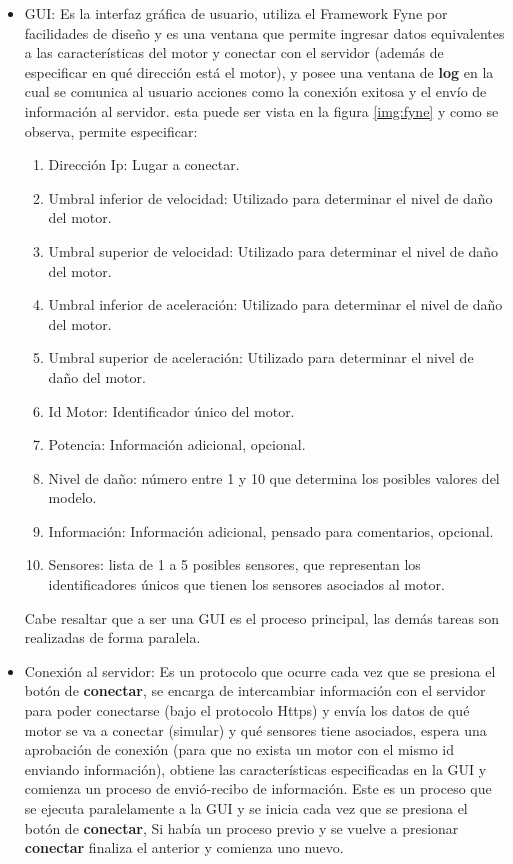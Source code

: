 \begin{itemize}
    \item GUI: Es la interfaz gráfica de usuario, utiliza el Framework Fyne por
        facilidades
        de diseño y es una ventana que permite ingresar datos equivalentes
        a las características del motor y conectar con el servidor (además de
        especificar en qué dirección está el motor), y posee una ventana de
        \textbf{log}  en la cual se comunica al usuario acciones como la conexión exitosa y
        el envío de información al servidor. esta puede ser vista
        en la figura \ref{img:fyne} y como se observa, permite especificar:
        \begin{enumerate}
            \item Dirección Ip: Lugar a conectar.
            \item Umbral inferior de velocidad: Utilizado para determinar el nivel de daño del motor.
            \item Umbral superior de velocidad: Utilizado para determinar el nivel de daño del motor.
            \item Umbral inferior de aceleración: Utilizado para determinar el nivel de daño del motor.
            \item Umbral superior de aceleración: Utilizado para determinar el nivel de daño del motor.
            \item Id Motor: Identificador único del motor.
            \item Potencia: Información adicional, opcional.
            \item Nivel de daño: número entre 1 y 10 que determina los posibles
                valores del modelo.
            \item Información: Información adicional, pensado para comentarios,
                opcional.
            \item Sensores: lista de 1 a 5 posibles sensores, que representan
                los identificadores únicos que tienen los sensores asociados
                al motor.
        \end{enumerate}

        Cabe resaltar que a ser una GUI es el proceso principal, las demás
        tareas son realizadas de forma paralela.

    \item Conexión al servidor: Es un protocolo que ocurre cada vez que se presiona
        el botón de \textbf{conectar}, se encarga de intercambiar información con el servidor
        para poder conectarse (bajo el protocolo Https) y envía los datos de
        qué motor se va a conectar (simular) y qué sensores tiene asociados, espera
        una aprobación de conexión (para que no exista un motor con el mismo id enviando
        información), obtiene las características especificadas en la GUI y
        comienza un proceso de envió-recibo de información.
        Este es un proceso
        que se ejecuta paralelamente a la GUI y se inicia cada vez que se
        presiona el botón de \textbf{conectar}, Si había un proceso previo y se vuelve a
        presionar \textbf{conectar} finaliza el anterior y comienza uno nuevo.


\end{itemize}
